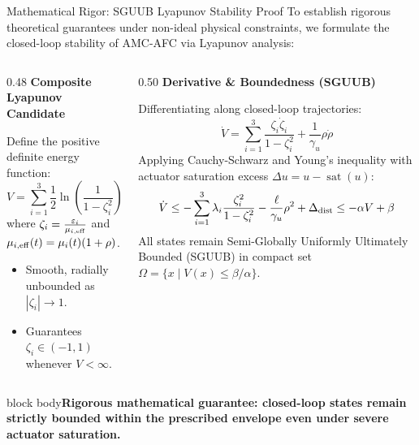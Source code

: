 \documentclass[aspectratio=169,10pt]{beamer}
\newcommand{\takeaway}[1]{\vfill\begin{beamercolorbox}[wd=\linewidth,sep=1ex]{block body}\color{accent}\bfseries #1\end{beamercolorbox}}
\begin{document}
\begin{frame}{Mathematical Rigor: SGUUB Lyapunov Stability Proof}
\footnotesize
To establish rigorous theoretical guarantees under non-ideal physical constraints, we formulate the closed-loop stability of AMC-AFC via Lyapunov analysis:
\par\vspace{0.05cm}
\begin{columns}[T]
\begin{column}{0.48\linewidth}
{\color{accent}\bfseries Composite Lyapunov Candidate}
\par\vspace{0.02cm}
Define the positive definite energy function:
\[ V = \sum_{i=1}^3 \frac{1}{2}\ln\left(\frac{1}{1-\zeta_i^2}\right) + \frac{1}{2\gamma_u}\rho^2 \]
where $\zeta_i = \frac{\varepsilon_i}{\mu_{i,\rm eff}}$ and $\mu_{i,\rm eff}(t) = \mu_i(t)(1+\rho)$.
\begin{itemize}\itemsep1pt
\item Smooth, radially unbounded as $|\zeta_i| \to 1$.
\item Guarantees $\zeta_i \in (-1, 1)$ whenever $V < \infty$.
\end{itemize}
\end{column}
\begin{column}{0.50\linewidth}
{\color{accent}\bfseries Derivative \& Boundedness (SGUUB)}
\par\vspace{0.02cm}
Differentiating along closed-loop trajectories:
\[ \dot{V} = \sum_{i=1}^3 \frac{\zeta_i \dot{\zeta}_i}{1-\zeta_i^2} + \frac{1}{\gamma_u}\rho\dot{\rho} \]
Applying Cauchy-Schwarz and Young's inequality with actuator saturation excess $\Delta u = u - \operatorname{sat}(u)$:
\[ \dot{V} \le -\sum_{i=1}^3 \lambda_i \frac{\zeta_i^2}{1-\zeta_i^2} - \frac{\ell}{\gamma_u}\rho^2 + \Delta_{\rm dist} \le -\alpha V + \beta \]
All states remain Semi-Globally Uniformly Ultimately Bounded (SGUUB) in compact set $\Omega = \{x \mid V(x) \le \beta/\alpha\}$.
\end{column}
\end{columns}
\par\vspace{0.05cm}
\takeaway{Rigorous mathematical guarantee: closed-loop states remain strictly bounded within the prescribed envelope even under severe actuator saturation.}
\end{frame}
\end{document}
